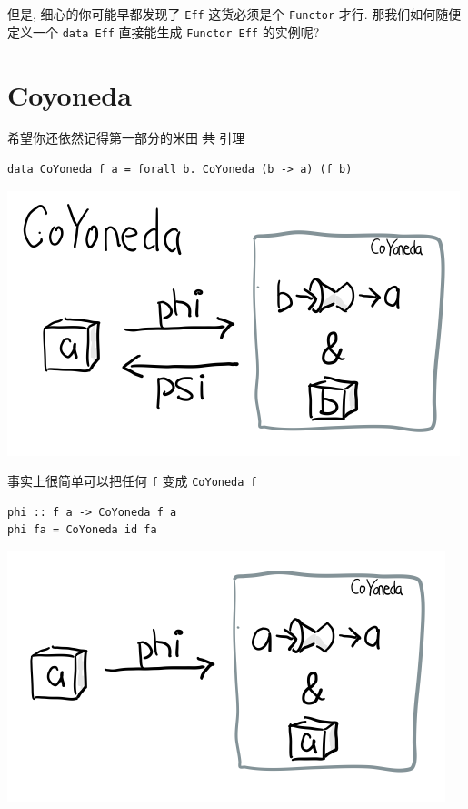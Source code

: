 \documentclass[letterspacing]{tufte-book}
\begin{document}
但是, 细心的你可能早都发现了 \texttt{Eff} 这货必须是个 \texttt{Functor} 才行. 那我们如何随便定义一个 \texttt{data Eff} 直接能生成 \texttt{Functor Eff} 的实例呢?

\section{Coyoneda}
\label{sec:org496bb2d}

希望你还依然记得第一部分的米田 \sout{共} 引理

\lstset{language=haskell,label= ,caption= ,captionpos=b,numbers=none}
\begin{lstlisting}
data CoYoneda f a = forall b. CoYoneda (b -> a) (f b)
\end{lstlisting}

\begin{center}
\includegraphics[width=.9\linewidth]{images/p3-CoYoneda.png}
\end{center}

事实上很简单可以把任何 \texttt{f} 变成 \texttt{CoYoneda f}

\lstset{language=haskell,label= ,caption= ,captionpos=b,numbers=none}
\begin{lstlisting}
phi :: f a -> CoYoneda f a
phi fa = CoYoneda id fa
\end{lstlisting}

\begin{center}
\includegraphics[width=.9\linewidth]{images/p3-CoYoneda-phi.png}
\end{center}
\end{document}
